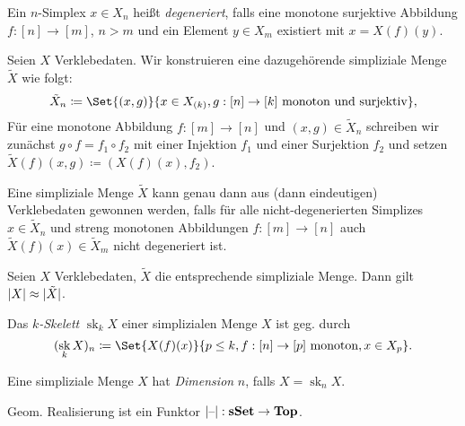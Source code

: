 \documentclass{cheat-sheet}
\DeclareMathOperator{\sk}{sk} %
\begin{document}
\begin{defn}
  Ein $n$-Simplex $x \in X_n$ heißt \emph{degeneriert}, falls eine monotone surjektive Abbildung $f : [n] \to [m]$, $n > m$ und ein Element $y \in X_m$ existiert mit $x = X(f)(y)$.
\end{defn}

\begin{defn}
  Seien $X$ Verklebedaten. Wir konstruieren eine dazugehörende simpliziale Menge $\tilde{X}$ wie folgt:
  \[ \tilde{X}_n \coloneqq \Set{ (x, g) }{ x \in X_{(k)}, g : [n] \to [k] \text{ monoton und surjektiv} }, \]
  Für eine monotone Abbildung $f : [m] \to [n]$ und $(x, g) \in \tilde{X}_n$ schreiben wir zunächst $g \circ f = f_1 \circ f_2$ mit einer Injektion $f_1$ und einer Surjektion $f_2$ und setzen
  $\tilde{X}(f)(x, g) \coloneqq (X(f)(x), f_2)$.
\end{defn}

\begin{prop}
  Eine simpliziale Menge $\tilde{X}$ kann genau dann aus (dann eindeutigen) Verklebedaten gewonnen werden, falls für alle nicht-degenerierten Simplizes $x \in \tilde{X}_n$ und streng monotonen Abbildungen $f : [m] \to [n]$ auch $\tilde{X}(f)(x) \in \tilde{X}_m$ nicht degeneriert ist.
\end{prop}


\begin{prop}
  Seien $X$ Verklebedaten, $\tilde{X}$ die entsprechende simpliziale Menge. Dann gilt $\lvert X\rvert \approx \lvert\tilde{X}\rvert$.
\end{prop}

\begin{defn}
  Das \emph{$k$-Skelett} $\sk_k X$ einer simplizialen Menge $X$ ist geg. durch
  \[ (\sk_k X)_n \coloneqq \Set{ X(f)(x) }{ p \leq k, f : [n] \to [p] \text{ monoton}, x \in X_p }. \]
\end{defn}

\begin{defn}
  Eine simpliziale Menge $X$ hat \emph{Dimension} $n$, falls $X = \sk_n X$.
\end{defn}

\begin{prop}
  Geom. Realisierung ist ein Funktor $\lvert\text{--}\rvert : \mathbf{sSet} \to \mathbf{Top}$.
\end{prop}
\end{document}
